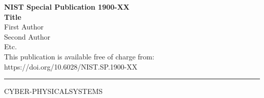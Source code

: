 \documentclass[12pt]{article}
\newcommand{\pubnumber}{1900-XX}
\newcommand{\DOI}{https://doi.org/10.6028/NIST.SP.1900-XX}
\begin{document}
	
	\begin{titlepage}
		\begin{flushright}
\LARGE{\textbf{NIST Special Publication \pubnumber}}\\
\vfill
\Huge{\textbf{Title}}\\
\vfill
\large First Author\\
\large Second Author\\
\large Etc.\\
\vfill
\normalsize This publication is available free of charge from:\\
\DOI\\
\vfill
\hrule 
\vspace{-5pt}
\begin{center}
	\Large{C\hspace{7pt}Y\hspace{7pt}B\hspace{7pt}E\hspace{7pt}R\hspace{7pt}-\hspace{7pt}P\hspace{7pt}H\hspace{7pt}Y\hspace{7pt}S\hspace{7pt}I\hspace{7pt}C\hspace{7pt}A\hspace{7pt}L\hspace{25pt}S\hspace{7pt}Y\hspace{7pt}S\hspace{7pt}T\hspace{7pt}E\hspace{7pt}M\hspace{7pt}S}\\

\end{center}
\end{flushright}
\end{titlepage}
\end{document}
